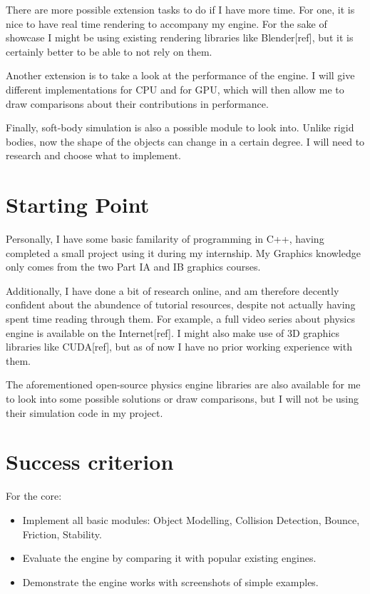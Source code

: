 \documentclass[12pt]{report}
\begin{document}
There are more possible extension tasks to do if I have more time. 
For one, it is nice to have real time rendering to accompany my engine.
For the sake of showcase I might be using existing rendering libraries like Blender[ref], 
but it is certainly better to be able to not rely on them.

Another extension is to take a look at the performance of the engine.
I will give different implementations for CPU and for GPU, 
which will then allow me to draw comparisons about their contributions in performance.

Finally, soft-body simulation is also a possible module to look into.
Unlike rigid bodies, now the shape of the objects can change in a certain degree.
I will need to research and choose what to implement. 

\section{Starting Point}

Personally, I have some basic familarity of programming in C++, having completed a small project using it during my internship.
My Graphics knowledge only comes from the two Part IA and IB graphics courses.

Additionally, I have done a bit of research online, 
and am therefore decently confident about the abundence of tutorial resources, 
despite not actually having spent time reading through them.
For example, a full video series about physics engine is available on the Internet[ref].
I might also make use of 3D graphics libraries like CUDA[ref], but as of now I have no prior working experience with them.

The aforementioned open-source physics engine libraries are also available for me to look into some possible solutions or draw comparisons, 
but I will not be using their simulation code in my project.

\section{Success criterion}


For the core:

\begin{itemize}
\item Implement all basic modules: Object Modelling, Collision Detection, Bounce, Friction, Stability.

\item Evaluate the engine by comparing it with popular existing engines.

\item Demonstrate the engine works with screenshots of simple examples.
\end{itemize}
\end{document}
